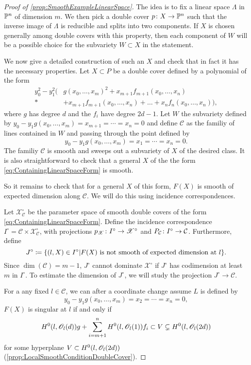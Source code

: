 \begin{proof}[Proof of \cref{prop:SmoothExampleLinearSpace}]
	The idea is to fix a linear space $\Lambda$ in $\P^n$ of dimension $m$. We then pick a double cover $p \from X \to \P^n$ such that the inverse image of $\Lambda$ is reducible and splits into two components. If $X$ is chosen generally among double covers with this property, then each component of $W$ will be a possible choice for the subvariety $W \subset X$ in the statement.
	
  We now give a detailed construction of such an $X$ and check that in fact it has the necessary properties. Let $X \subset P$ be a double cover defined by a polynomial of the form
  \begin{align}
    \label{eq:ContainingLinearSpaceForm}
    y_0^2 - y_1^2(&g(x_0,\dots,x_m)^2 + x_{m+1}f_{m+1}(x_0,\dots,x_n) \nonumber\\*
 &+ x_{m+1}f_{m+1}(x_0,\dots,x_n) + \dots + x_nf_n(x_0,\dots,x_n)), 
  \end{align}
where $g$ has degree $d$ and the $f_i$ have degree $2d-1$. Let $W$ the subvariety defined by $y_0-y_1g(x_0,\dots,x_m) = x_{m+1} = \cdots = x_n = 0$ and define $\mathcal{C}$ as the familiy of lines contained in $W$ and passing through the point defined by 
\[y_0-y_1g(x_0,\dots,x_m) = x_{1} = \cdots = x_n = 0.\]
The familiy $\mathcal{C}$ is smooth and sweeps out a subvariety of $X$ of the desired class. It is also straightforward to check that a general $X$ of the the form \eqref{eq:ContainingLinearSpaceForm} is smooth.

So it remains to check that for a general $X$ of this form, $F(X)$ is smooth of expected dimension along $\mathcal{C}$. We will do this using incidence correspondences.

Let $\mathscr{X}_{\mathcal{C}}^\circ$ be the parameter space of smooth double covers of the form \eqref{eq:ContainingLinearSpaceForm}.
Define the incidence correspondence $I^\circ = \mathcal{C} \times \mathscr{X}_{\mathcal{C}}^\circ$, with projections $p_{\mathscr{X}} \from I^\circ \to \mathscr{X}^\circ$ and $P_{\mathcal{C}} \from I^\circ \to \mathcal{C}$. Furthermore, define
\[ J^\circ \coloneqq \set{(l,X) \in I^\circ \vert F(X) \text{ is not smooth of expected dimension at } l}.\]
Since $\dim(\mathcal{C}) = m-1$, $J^\circ$ cannot dominate $\mathcal{X}^\circ$ if $J^\circ$ has codimension at least $m$ in $I^\circ$. To estimate the dimension of $J^\circ$, we will study the projection $J^\circ \to \mathcal{C}$.

For a any fixed $l \in \mathcal{C}$, we can after a coordinate change assume $L$ is defined by
\begin{equation}
  \label{eq:LineDefinition1}
  y_0-y_1g(x_0,\dots,x_m) = x_2 = \cdots = x_n = 0,
\end{equation}
$F(X)$ is singular at $l$ if and only if
\begin{equation}
  \label{eq:SingularCondition1DoubleCovers}
  H^0(l,\sO_l(d))g + \sum_{i=m+1}^nH^0(l,\sO_l(1))f_i \subset V \subsetneq H^0(l,\sO_l(2d))
\end{equation}
for some hyperplane $V \subset H^0(l,\sO_l(2d))$(\cref{prop:LocalSmoothConditionDoubleCover}).


\end{proof}
